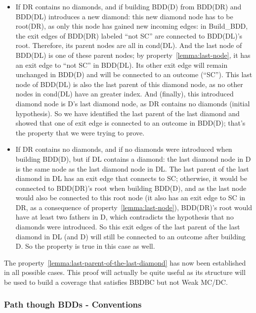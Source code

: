 \documentclass[a4paper,12pt,twoside]{article}
\begin{document}
\begin{itemize}
\begin{itemize}
  \item If DR contains no diamonds, and if building BDD(D) from
    BDD(DR) and BDD(DL) introduces a new diamond: this new diamond
    node has to be root(DR), as only this node has gained new incoming
    edges: in Build\_BDD, the exit edges of BDD(DR) labeled ``not SC''
    are connected to BDD(DL)'s root. Therefore, its parent nodes are
    all in cond(DL). And the last node of BDD(DL) is one of these
    parent nodes; by property~\ref{lemma:last-node}, it has an exit
    edge to ``not SC'' in BDD(DL). Its other exit edge will remain
    unchanged in BDD(D) and will be connected to an outcome
    (``SC''). This last node of BDD(DL) is also the last parent of
    this diamond node, as no other nodes in cond(DL) have an greater
    index. And (finally), this introduced diamond node is D's last
    diamond node, as DR contains no diamonds (initial hypothesis). So
    we have identified the last parent of the last diamond and showed
    that one of exit edge is connected to an outcome in BDD(D); that's
    the property that we were trying to prove.

  \item If DR contains no diamonds, and if no diamonds were introduced
    when building BDD(D), but if DL contains a diamond: the last
    diamond node in D is the same node as the last diamond node in DL.
    The last parent of the last diamond in DL has an exit edge that
    connects to SC; otherwise, it would be connected to BDD(DR)'s root
    when building BDD(D), and as the last node would also be connected
    to this root node (it also has an exit edge to SC in DR, as a
    consequence of property~\ref{lemma:last-node}), BDD(DR)'s root
    would have at least two fathers in D, which contradicts the
    hypothesis that no diamonds were introduced. So this exit edges of
    the last parent of the last diamond in DL (and D) will still be
    connected to an outcome after building D. So the property is true
    in this case as well.
  \end{itemize}
\end{itemize}

The property~\ref{lemma:last-parent-of-the-last-diamond} has now been
established in all possible cases. This proof will actually be quite
useful as its structure will be used to build a coverage that satisfies
BBDBC but not Weak MC/DC.

\subsubsection{Path though BDDs - Conventions}
\end{document}
